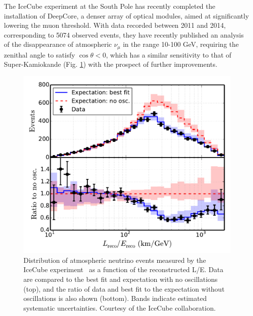 The IceCube experiment at the South Pole has recently completed the installation of DeepCore, a denser array of optical modules, aimed at significantly lowering the muon threshold. With data recorded between 2011 and 2014, corresponding to 5074 observed events, they have recently published an analysis~\cite{Aartsen2016161} of the disappearance of atmospheric $\nu_\mu$   in the range 10-100 GeV, requiring the zenithal angle to satisfy $\cos \theta < 0$,  which has a similar sensitivity to that of Super-Kamiokande (Fig. \ref{fig:icecubeosc}) with the prospect of further improvements. 


\begin{figure}[htbp]
\centering
\includegraphics[width=0.6\linewidth]{figures/icecube_osc2014_data_mc_LE.pdf}
  \caption{Distribution of atmospheric neutrino events measured by the IceCube experiment~\cite{Aartsen2016161} as a function of the
reconstructed L/E. Data are compared to the best fit and
expectation with no oscillations (top), and the ratio of data
and best fit to the expectation without oscillations is also shown
(bottom). Bands indicate estimated systematic uncertainties. Courtesy of the IceCube collaboration.}
 \label{fig:icecubeosc}
 \end{figure}
